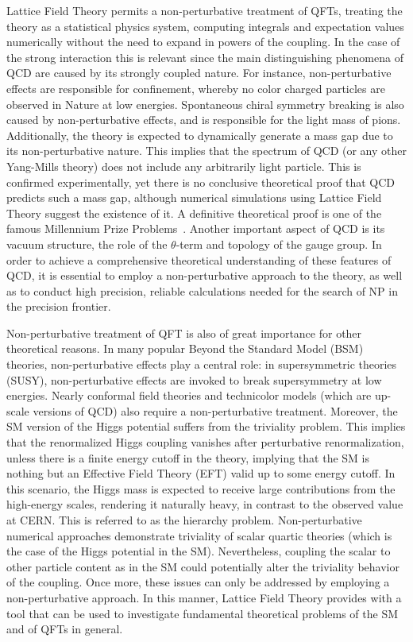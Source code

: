 Lattice Field Theory permits a non-perturbative treatment of QFTs, treating the theory as a statistical physics system, computing integrals and expectation values numerically without the need to expand in powers of the coupling. In the case of the strong interaction this is relevant since the main distinguishing phenomena of QCD are caused by its strongly coupled nature. For instance, non-perturbative effects are responsible for confinement, whereby no color charged particles are observed in Nature at low energies. Spontaneous chiral symmetry breaking is also caused by non-perturbative effects, and is responsible for the light mass of pions. Additionally, the theory is expected to dynamically generate a mass gap due to its non-perturbative nature. This implies that the spectrum of QCD (or any other Yang-Mills theory) does not include any arbitrarily light particle. This is confirmed experimentally, yet there is no conclusive theoretical proof that QCD predicts such a mass gap, although numerical simulations using Lattice Field Theory suggest the existence of it. A definitive theoretical proof is one of the famous Millennium Prize Problems~\citep{MillenniumPrizeproblems}. Another important aspect of QCD is its vacuum structure, the role of the $\theta$-term and topology of the gauge group. In order to achieve a comprehensive theoretical understanding of these features of QCD, it is essential to employ a non-perturbative approach to the theory, as well as to conduct high precision, reliable calculations needed for the search of NP in the precision frontier.

Non-perturbative treatment of QFT is also of great importance for other theoretical reasons. In many popular Beyond the Standard Model (BSM) theories, non-perturbative effects play a central role: in supersymmetric theories (SUSY), non-perturbative effects are invoked to break supersymmetry at low energies. Nearly conformal field theories and technicolor models (which are up-scale versions of QCD) also require a non-perturbative treatment.  Moreover, the SM version of the Higgs potential suffers from the triviality problem. This implies that the renormalized Higgs coupling vanishes after perturbative renormalization, unless there is a finite energy cutoff in the theory, implying that the SM is nothing but an Effective Field Theory (EFT) valid up to some energy cutoff. In this scenario, the Higgs mass is expected to receive large contributions from the high-energy scales, rendering it naturally heavy, in contrast to the observed value at CERN. This is referred to as the hierarchy problem. Non-perturbative numerical approaches demonstrate triviality of scalar quartic theories (which is the case of the Higgs potential in the SM). Nevertheless, coupling the scalar to other particle content as in the SM could potentially alter the triviality behavior of the coupling. Once more, these issues can only be addressed by employing a non-perturbative approach. In this manner, Lattice Field Theory provides with a tool that can be used to investigate fundamental theoretical problems of the SM and of QFTs in general.

